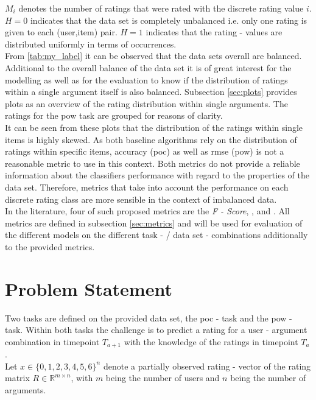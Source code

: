 \noindent $M_i$ denotes the number of ratings that were rated with the discrete rating value $i$.\\
\noindent $H=0$ indicates that the data set is completely unbalanced i.e. only one rating is given to each (user,item) pair. $H=1$ indicates that the rating - values are distributed uniformly in terms of occurrences.\\
From \autoref{tab:my_label} it can be observed that the data sets overall are balanced.  Additional to the overall balance of the data set it is of great interest for the modelling as well as for the evaluation to know if the distribution of ratings within a single argument itself is also balanced. Subsection \ref{sec:plots} provides plots as an overview of the rating distribution within single arguments. The ratings for the \acrshort{pow} task are grouped for reasons of clarity.\\
It can be seen from these plots that the distribution of the ratings within single items is highly skewed. As both baseline algorithms rely on the distribution of ratings within specific items, accuracy (\acrshort{poc}) as well as \acrfull{rmse} (\acrshort{pow}) is not a reasonable metric to use in this context. Both metrics do not provide a reliable information about the classifiers performance with regard to the properties of the data set. Therefore, metrics that take into account the performance on each discrete rating class are more sensible in the context of imbalanced data.\\
In the literature, four of such proposed metrics are the \textit{F - Score}, ,  and  \cite{he2009learning}. All metrics are defined in subsection \ref{sec:metrics} and will be used for evaluation of the different models on the different task - / data set - combinations additionally to the provided metrics.

\section{Problem Statement}
\label{sec:problem}
Two tasks are defined on the provided data set, the \acrshort{poc} - task and the \acrshort{pow} - task. Within both tasks the challenge is to predict a rating for a user - argument combination in timepoint $T_{a+1}$ with the knowledge of the ratings in timepoint $T_a$.\\ Let $x \in \{0,1,2,3,4,5,6\}^{n}$ denote a partially observed rating - vector of the rating matrix $R \in \mathbb{R}^{m \times n}$, with $m$ being the number of users and $n$ being the number of arguments.

